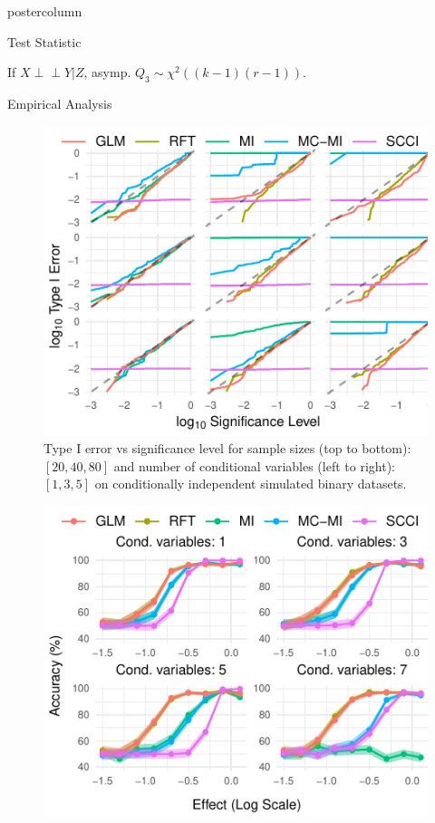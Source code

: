 \documentclass{beamer}
\def\ci{\perp\!\!\!\!\!\perp}
\begin{document}
\begin{frame}
\begin{columns}
\begin{column}{.33\textwidth}
\begin{beamercolorbox}[center]{postercolumn}
\begin{minipage}{.98\textwidth}
{\begin{myblock}{Test Statistic}
\begin{itemize}
							If $ X \ci Y | Z $, asymp. $ Q_3 \sim \chi^2((k-1)(r-1)) $.
						\end{itemize}

					\end{myblock}\vfill
					\begin{myblock}{Empirical Analysis}
						\begin{figure}
							\centering
							\includegraphics[scale=3]{../in_person/imgs/calibration_add_vars.pdf}
							\caption{Type I error vs significance level for sample sizes (top to
							bottom): $ [20, 40, 80] $ and number of conditional variables (left to
							right): $ [1, 3, 5] $ on conditionally independent simulated binary
							datasets.}
							\label{fig:calibration}
						\end{figure}
						\begin{figure}
							\centering
							\includegraphics[scale=3]{../in_person/imgs/accuracy.pdf}

\end{figure}
\end{myblock}}
\end{minipage}
\end{beamercolorbox}
\end{column}
\end{columns}
\end{frame}
\end{document}
